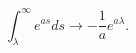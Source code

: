 \begin{equation}
\int_\lambda^\infty e^{as} ds \rightarrow
-\frac{1}{a}  e^{a \lambda}.
\end{equation}

